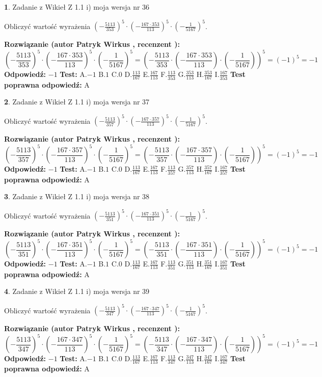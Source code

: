 \documentclass[12pt, a4paper]{article}
\theoremstyle{definition} %
\newtheorem{zad}{}
\newcommand{\zadStart}[1]{\begin{zad}#1\newline}
\newcommand{\zadStop}{\end{zad}}
\newcommand{\rozwStart}[2]{\noindent \textbf{Rozwiązanie (autor #1 , recenzent #2): }\newline}
\newcommand{\rozwStop}{\newline}
\newcommand{\odpStart}{\noindent \textbf{Odpowiedź:}\newline}
\newcommand{\odpStop}{\newline}
\newcommand{\testStart}{\noindent \textbf{Test:}\newline}
\newcommand{\testStop}{\newline}
\newcommand{\kluczStart}{\noindent \textbf{Test poprawna odpowiedź:}\newline}
\newcommand{\kluczStop}{\newline}
\begin{document}
\zadStart{Zadanie z Wikieł Z 1.1 i) moja wersja nr 36}

Obliczyć wartość wyrażenia $(-\frac{5113}{353})^{5} \cdot (-\frac{167 \cdot 353}{113})^{5} \cdot (-\frac{1}{5167})^{5}$.
\zadStop
\rozwStart{Patryk Wirkus}{}
$$(-\frac{5113}{353})^{5} \cdot (-\frac{167 \cdot 353}{113})^{5} \cdot (-\frac{1}{5167})^{5} = (-\frac{5113}{353} \cdot (-\frac{167 \cdot 353}{113}) \cdot (-\frac{1}{5167}))^{5} = (-1)^{5} = -1$$
\rozwStop
\odpStart
$-1$
\odpStop
\testStart
A.$-1$ B.$1$ C.$0$ D.$\frac{113}{167}$ E.$\frac{167}{113}$
F.$\frac{113}{353}$ G.$\frac{353}{113}$
H.$\frac{353}{167}$
I.$\frac{167}{353}$
\testStop
\kluczStart
A
\kluczStop



\zadStart{Zadanie z Wikieł Z 1.1 i) moja wersja nr 37}

Obliczyć wartość wyrażenia $(-\frac{5113}{357})^{5} \cdot (-\frac{167 \cdot 357}{113})^{5} \cdot (-\frac{1}{5167})^{5}$.
\zadStop
\rozwStart{Patryk Wirkus}{}
$$(-\frac{5113}{357})^{5} \cdot (-\frac{167 \cdot 357}{113})^{5} \cdot (-\frac{1}{5167})^{5} = (-\frac{5113}{357} \cdot (-\frac{167 \cdot 357}{113}) \cdot (-\frac{1}{5167}))^{5} = (-1)^{5} = -1$$
\rozwStop
\odpStart
$-1$
\odpStop
\testStart
A.$-1$ B.$1$ C.$0$ D.$\frac{113}{167}$ E.$\frac{167}{113}$
F.$\frac{113}{357}$ G.$\frac{357}{113}$
H.$\frac{357}{167}$
I.$\frac{167}{357}$
\testStop
\kluczStart
A
\kluczStop



\zadStart{Zadanie z Wikieł Z 1.1 i) moja wersja nr 38}

Obliczyć wartość wyrażenia $(-\frac{5113}{351})^{5} \cdot (-\frac{167 \cdot 351}{113})^{5} \cdot (-\frac{1}{5167})^{5}$.
\zadStop
\rozwStart{Patryk Wirkus}{}
$$(-\frac{5113}{351})^{5} \cdot (-\frac{167 \cdot 351}{113})^{5} \cdot (-\frac{1}{5167})^{5} = (-\frac{5113}{351} \cdot (-\frac{167 \cdot 351}{113}) \cdot (-\frac{1}{5167}))^{5} = (-1)^{5} = -1$$
\rozwStop
\odpStart
$-1$
\odpStop
\testStart
A.$-1$ B.$1$ C.$0$ D.$\frac{113}{167}$ E.$\frac{167}{113}$
F.$\frac{113}{351}$ G.$\frac{351}{113}$
H.$\frac{351}{167}$
I.$\frac{167}{351}$
\testStop
\kluczStart
A
\kluczStop



\zadStart{Zadanie z Wikieł Z 1.1 i) moja wersja nr 39}

Obliczyć wartość wyrażenia $(-\frac{5113}{347})^{5} \cdot (-\frac{167 \cdot 347}{113})^{5} \cdot (-\frac{1}{5167})^{5}$.
\zadStop
\rozwStart{Patryk Wirkus}{}
$$(-\frac{5113}{347})^{5} \cdot (-\frac{167 \cdot 347}{113})^{5} \cdot (-\frac{1}{5167})^{5} = (-\frac{5113}{347} \cdot (-\frac{167 \cdot 347}{113}) \cdot (-\frac{1}{5167}))^{5} = (-1)^{5} = -1$$
\rozwStop
\odpStart
$-1$
\odpStop
\testStart
A.$-1$ B.$1$ C.$0$ D.$\frac{113}{167}$ E.$\frac{167}{113}$
F.$\frac{113}{347}$ G.$\frac{347}{113}$
H.$\frac{347}{167}$
I.$\frac{167}{347}$
\testStop
\kluczStart
A
\kluczStop
\end{document}
